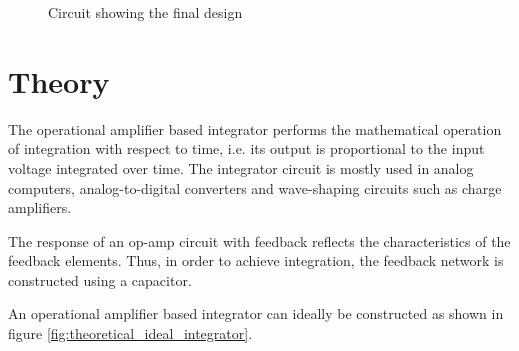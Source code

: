 \documentclass[12pt, titlepage]{article}
\theoremstyle{definition}
\begin{document}
\begin{figure}[h]
\begin{tikzpicture}

      \end{tikzpicture}
      \caption{Circuit showing the final design}
      \label{fig:designed_practical_integrator}
    \end{figure}

  \newpage
  \section{Theory}
    The operational amplifier based integrator performs the mathematical operation of integration with respect to time, i.e. its output is proportional to the input voltage integrated over time.
    The integrator circuit is mostly used in analog computers, analog-to-digital converters and wave-shaping circuits such as charge amplifiers.

    The response of an op-amp circuit with feedback reflects the characteristics of the feedback elements. Thus, in order to achieve integration, the feedback network is constructed using a capacitor.

    An operational amplifier based integrator can ideally be constructed as shown in figure \ref{fig:theoretical_ideal_integrator}.
\end{document}
